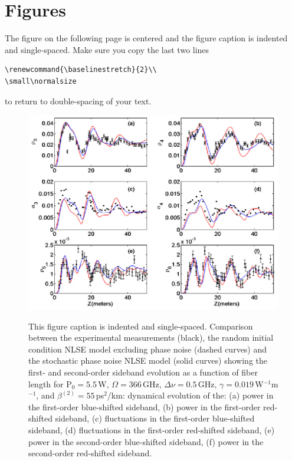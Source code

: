 \newpage


\section{Figures}

The figure on the following page is centered and the figure caption is indented and single-spaced.  Make sure you copy the last two lines \begin{verbatim}
\renewcommand{\baselinestretch}{2}\\
\small\normalsize\end{verbatim} to return to double-spacing of your text.

\begin{figure}
\begin{center}
\includegraphics[width=6in]{nlsez55phaseornot.eps}
\end{center}
\renewcommand{\baselinestretch}{1}
\small\normalsize
\begin{quote}
\caption[Figure with caption indented]{This figure caption is indented and single-spaced.  Comparison between the experimental measurements \cite{hart1} (black), the random initial condition NLSE model excluding phase noise (dashed curves) and the stochastic phase noise NLSE model (solid curves) showing the first- and second-order sideband evolution as a function of fiber length for P$_{0} = 5.5$\,W, $\Omega = 366$\,GHz, $\Delta\nu = 0.5$\,GHz, $\gamma = 0.019$\,W$^{-1}$m$^{-1}$, and $\beta^{(2)} = 55$\,ps$^2$/km: dynamical evolution of the: (a) power in the first-order blue-shifted sideband, (b) power in the first-order red-shifted sideband, (c) fluctuations in the first-order blue-shifted sideband, (d) fluctuations in the first-order red-shifted sideband, (e) power in the second-order blue-shifted sideband, (f) power in the second-order red-shifted sideband. \label{fig:fig27}}
\end{quote}
\end{figure} 
\renewcommand{\baselinestretch}{2}
\small\normalsize

